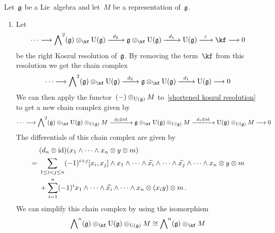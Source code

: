 \begin{construction}
  \label{lie algebra homology and cohomology via koszul complex}
  Let~$\mathfrak{g}$ be a Lie~algebra and let~$M$ be a representation of~$\mathfrak{g}$.
  \begin{enumerate}
    \item
      Let
      \[
        \dotsb
        \to
        \Exterior^2(\glie) \otimes_{\kf} \Univ(\glie)
        \xto{d_2}
        \glie \otimes_{\kf} \Univ(\glie)
        \xto{d_1}
        \Univ(\glie)
        \xto{\varepsilon}
        \kf
        \to
        0
      \]
      be the right Koszul resolution of~$\mathfrak{g}$.
      By removing the term~$\kf$ from this resolution we get the chain complex
      \begin{equation}
        \label{shortened right koszul resolution}
        \dotsb
        \to
        \Exterior^2(\glie) \otimes_{\kf} \Univ(\glie)
        \xto{d_2}
        \glie \otimes_{\kf} \Univ(\glie)
        \xto{d_1}
        \Univ(\glie)
        \to
        0
      \end{equation}
      We can then apply the functor~$(-) \otimes_{\operatorname{U}(\mathfrak{g})} M$ to~\eqref{shortened koszul resolution} to get a new chain complex given by
      \[
        \dotsb
        \to
        \Exterior^2(\glie) \otimes_{\kf} \Univ(\glie) \otimes_{\Univ(\glie)} M
        \xto{d_2 \otimes \id}
        \glie \otimes_{\kf} \Univ(\glie) \otimes_{\Univ(\glie)} M
        \xto{d_1 \otimes \id}
        \Univ(\glie) \otimes_{\Univ(\glie)} M
        \to
        0
      \]
      The differentials of this chain complex are given by
      \begin{align*}
        {}&
        (d_n \otimes \mathrm{id})(x_1 \wedge \dotsb \wedge x_n \otimes y \otimes m)
        \\
        ={}&
        \sum_{1 \leq i < j \leq n}
        (-1)^{i+j}
        [x_i, x_j] \wedge x_1 \wedge \dotsb \wedge \widehat{x_i} \wedge \dotsb \wedge \widehat{x_j} \wedge \dotsb \wedge x_n
        \otimes y \otimes m
        \\
        {}&
        +
        \sum_{i=1}^n
        (-1)^i
        x_1 \wedge \dotsb \wedge \widehat{x_i} \wedge \dotsb \wedge x_n \otimes (x_i y) \otimes m \,.
      \end{align*}
      We can simplify this chain complex by using the isomorphism
      \begin{equation}
        \label{isomorphism for triple tensor product}
        \Exterior^n(\glie) \otimes_{\kf} \Univ(\glie) \otimes_{\Univ(\glie)} M
        \cong
        \Exterior^n(\glie) \otimes_{\kf} M

\end{equation}
\end{enumerate}
\end{construction}
